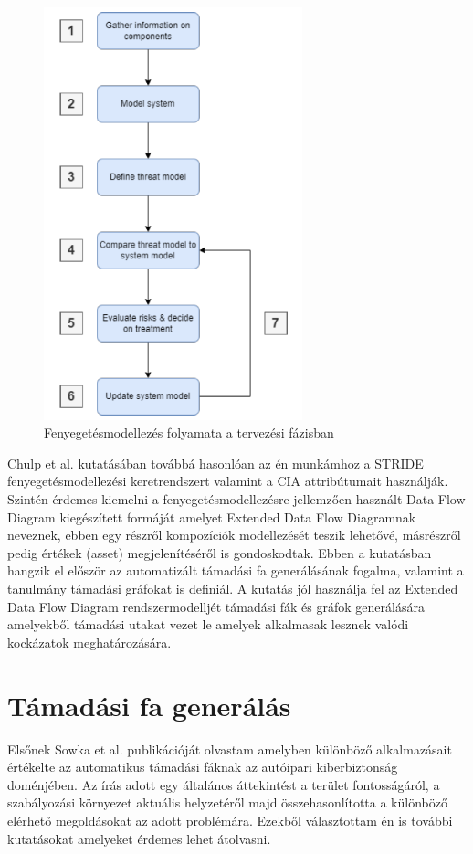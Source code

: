 \begin{figure}[!ht]
\centering
\includegraphics[width=75mm, keepaspectratio]{figures/03_CHULP.png}
\caption{Fenyegetésmodellezés folyamata a tervezési fázisban\cite{Chulp}}
\label{fig:CHULP}
\end{figure}

Chulp et al.\cite{Chulp} kutatásában továbbá hasonlóan az én munkámhoz a STRIDE fenyegetésmodellezési keretrendszert valamint a CIA attribútumait használják. Szintén érdemes kiemelni a fenyegetésmodellezésre jellemzően használt Data Flow Diagram kiegészített formáját amelyet Extended Data Flow Diagramnak neveznek, ebben egy részről kompozíciók modellezését teszik lehetővé, másrészről pedig értékek (asset) megjelenítéséről is gondoskodtak.
Ebben a kutatásban hangzik el először az automatizált támadási fa generálásának fogalma, valamint a tanulmány támadási gráfokat is definiál. A kutatás jól használja fel az Extended Data Flow Diagram rendszermodelljét támadási fák és gráfok generálására amelyekből támadási utakat vezet le amelyek alkalmasak lesznek valódi kockázatok meghatározására.

\section{Támadási fa generálás}

Elsőnek Sowka et al.\cite{Sowka} publikációját olvastam amelyben különböző alkalmazásait értékelte az automatikus támadási fáknak az autóipari kiberbiztonság doménjében. Az írás adott egy általános áttekintést a terület fontosságáról, a szabályozási környezet aktuális helyzetéről majd összehasonlította a különböző elérhető megoldásokat az adott problémára. Ezekből választottam én is további kutatásokat amelyeket érdemes lehet átolvasni.

